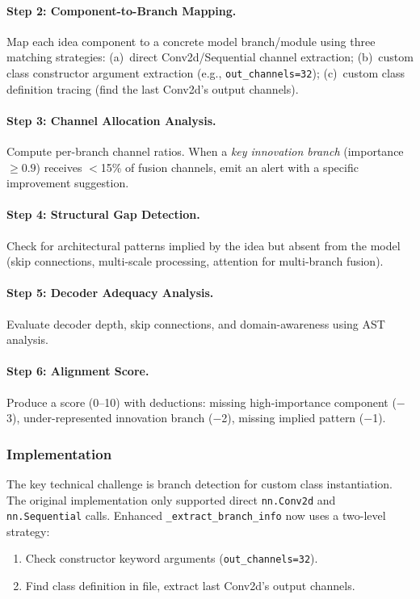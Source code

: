 \documentclass[11pt,a4paper]{article}
\newcommand{\toolname}[1]{\texttt{#1}}
\begin{document}
\paragraph{Step 2: Component-to-Branch Mapping.}
Map each idea component to a concrete model branch/module using three matching strategies:
(a)~direct Conv2d/Sequential channel extraction;
(b)~custom class constructor argument extraction (e.g., \toolname{out\_channels=32});
(c)~custom class definition tracing (find the last Conv2d's output channels).

\paragraph{Step 3: Channel Allocation Analysis.}
Compute per-branch channel ratios. When a \emph{key innovation branch} (importance $\geq 0.9$) receives $<$15\% of fusion channels, emit an alert with a specific improvement suggestion.

\paragraph{Step 4: Structural Gap Detection.}
Check for architectural patterns implied by the idea but absent from the model (skip connections, multi-scale processing, attention for multi-branch fusion).

\paragraph{Step 5: Decoder Adequacy Analysis.}
Evaluate decoder depth, skip connections, and domain-awareness using AST analysis.

\paragraph{Step 6: Alignment Score.}
Produce a score (0--10) with deductions:
missing high-importance component ($-$3), under-represented innovation branch ($-$2), missing implied pattern ($-$1).

\subsubsection{Implementation}

The key technical challenge is branch detection for custom class instantiation. The original implementation only supported direct \toolname{nn.Conv2d} and \toolname{nn.Sequential} calls. Enhanced \toolname{\_extract\_branch\_info} now uses a two-level strategy:
\begin{enumerate}[nosep]
\item Check constructor keyword arguments (\toolname{out\_channels=32}).
\item Find class definition in file, extract last Conv2d's output channels.
\end{enumerate}
\end{document}
